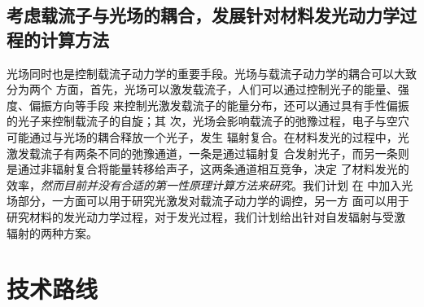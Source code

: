 \subsection{考虑载流子与光场的耦合，发展针对材料发光动力学过程的计算方法}


光场同时也是控制载流子动力学的重要手段。光场与载流子动力学的耦合可以大致分为两个
方面，首先，光场可以激发载流子，人们可以通过控制光子的能量、强度、偏振方向等手段
来控制光激发载流子的能量分布，还可以通过具有手性偏振的光子来控制载流子的自旋；其
次，光场会影响载流子的弛豫过程，电子与空穴可能通过与光场的耦合释放一个光子，发生
辐射复合。在材料发光的过程中，光激发载流子有两条不同的弛豫通道，一条是通过辐射复
合发射光子，而另一条则是通过非辐射复合将能量转移给声子，这两条通道相互竞争，决定
了材料发光的效率，\emph{然而目前并没有合适的第一性原理计算方法来研究}。我们计划
在 \hnamd{} 中加入光场部分，一方面可以用于研究光激发对载流子动力学的调控，另一方
面可以用于研究材料的发光动力学过程，对于发光过程，我们计划给出针对自发辐射与受激
辐射的两种方案。

\section{技术路线}

